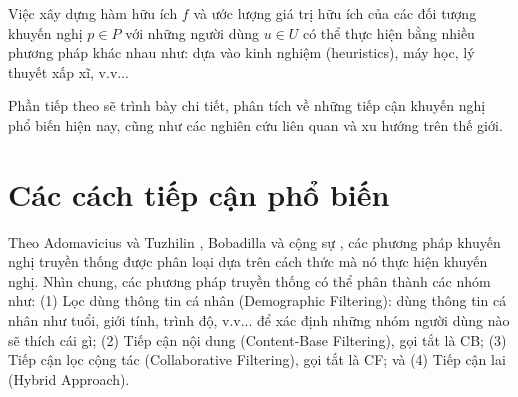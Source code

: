 Việc xây dựng hàm hữu ích $f$ và ước lượng giá trị hữu ích của các đối tượng khuyến nghị $p \in P$ với những người dùng $u \in U$ có thể thực hiện bằng nhiều phương pháp khác nhau như: dựa vào kinh nghiệm (heuristics), máy học, lý thuyết xấp xĩ, v.v...

Phần tiếp theo sẽ trình bày chi tiết, phân tích về những tiếp cận khuyến nghị phổ biến hiện nay, cũng như các nghiên cứu liên quan và xu hướng trên thế giới.
\section{Các cách tiếp cận phổ biến}
Theo Adomavicius và Tuzhilin \cite{Adomavicius:2005:TNG:1070611.1070751}, Bobadilla và cộng sự \cite{Bobadilla2013109}, các phương pháp khuyến nghị truyền thống được phân loại dựa trên cách thức mà nó thực hiện khuyến nghị. Nhìn chung, các phương pháp truyền thống có thể phân thành các nhóm như: (1) Lọc dùng thông tin cá nhân (Demographic Filtering): dùng thông tin cá nhân như tuổi, giới tính, trình độ, v.v... để xác định những nhóm người dùng nào sẽ thích cái gì; (2) Tiếp cận nội dung (Content-Base Filtering), gọi tắt là CB; (3) Tiếp cận lọc cộng tác (Collaborative Filtering), gọi tắt là CF; và (4) Tiếp cận lai (Hybrid Approach).
